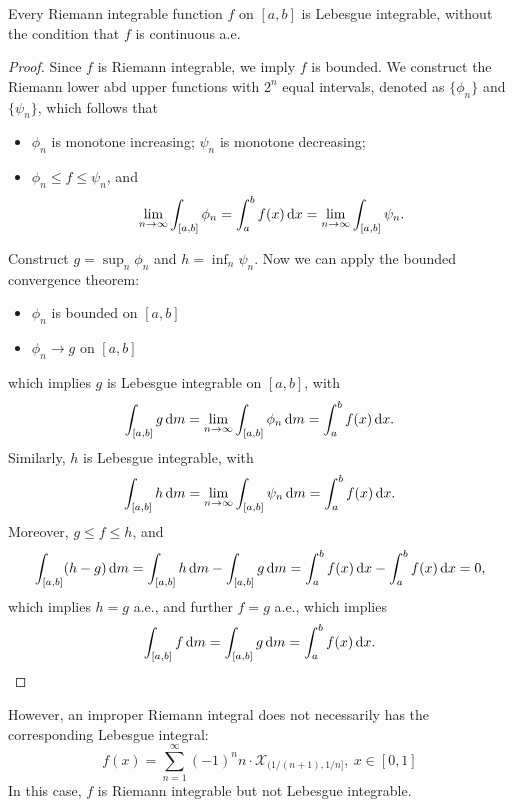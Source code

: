 \begin{proposition}
Every Riemann integrable function $f$ on $[a,b]$ is Lebesgue integrable, without the condition that $f$ is continuous a.e.
\end{proposition}
\begin{proof}
Since $f$ is Riemann integrable, we imply $f$ is bounded.
We construct the Riemann lower abd upper functions with $2^n$ equal intervals, denoted as $\{\phi_n\}$ and $\{\psi_n\}$, which follows that
\begin{itemize}
\item
$\phi_n$ is monotone increasing;
$\psi_n$ is monotone decreasing;
\item
$\phi_n\le f\le \psi_n$, and
\[
\lim_{n\to\infty}\int_{[a,b]}\phi_n=\int_a^bf(x)\,\mathrm{d} x = \lim_{n\to\infty}\int_{[a,b]}\psi_n.
\]
\end{itemize}
Construct $g=\sup_n\phi_n$ and $h=\inf_n\psi_n$.
Now we can apply the bounded convergence theorem:
\begin{itemize}
\item
$\phi_n$ is bounded on $[a,b]$
\item
$\phi_n\to g$ on $[a,b]$
\end{itemize}
which implies
$g$ is Lebesgue integrable on $[a,b]$, with 
\[
\int_{[a,b]}g\,\mathrm{d} m = \lim_{n\to\infty}\int_{[a,b]}\phi_n\,\mathrm{d} m=\int_a^bf(x)\,\mathrm{d} x.
\]
Similarly, $h$ is Lebesgue integrable, with
\[
\int_{[a,b]}h\,\mathrm{d} m = \lim_{n\to\infty}\int_{[a,b]}\psi_n\,\mathrm{d} m=\int_a^bf(x)\,\mathrm{d} x.
\]
Moreover, $g\le f\le h$, and
\[
\int_{[a,b]}(h-g)\,\mathrm{d} m = \int_{[a,b]}h\,\mathrm{d} m - \int_{[a,b]}g\,\mathrm{d} m=\int_a^bf(x)\,\mathrm{d} x-\int_a^bf(x)\,\mathrm{d} x=0,
\]
which implies $h=g$ a.e., and further $f=g$ a.e., which implies
\[
\int_{[a,b]} f\,\mathrm{d} m = \int_{[a,b]} g\,\mathrm{d} m= \int_a^bf(x)\,\mathrm{d} x.
\]
\end{proof}
\begin{remark}
However, an improper Riemann integral does not necessarily has the corresponding Lebesgue integral:
\[
f(x)=\sum_{n=1}^\infty (-1)^nn\cdot\mathcal{X}_{(1/(n+1),1/n]},\ x\in[0,1]
\]
In this case, $f$ is Riemann integrable but not Lebesgue integrable.
\end{remark}














